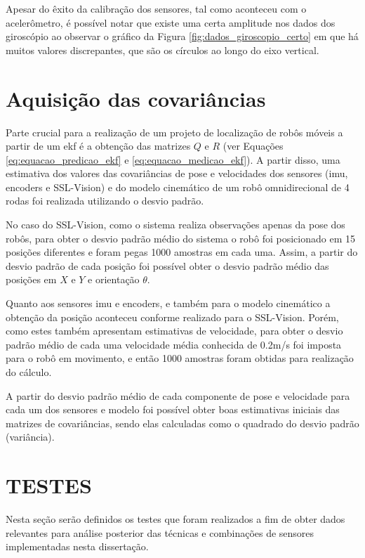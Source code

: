 \documentclass[acronym, symbols, table, deposito]{fei}
\begin{document}
	Apesar do êxito da calibração dos sensores, tal como aconteceu com o acelerômetro, é possível notar que existe uma certa amplitude nos dados dos giroscópio ao observar o gráfico da Figura \ref{fig:dados_giroscopio_certo} em que há muitos valores discrepantes, que são os círculos ao longo do eixo vertical.
	
	\section{Aquisição das covariâncias}
	
		Parte crucial para a realização de um projeto de localização de robôs móveis a partir de um \acrlong{ekf} é a obtenção das matrizes $Q$ e $R$ (ver Equações \eqref{eq:equacao_predicao_ekf} e \eqref{eq:equacao_medicao_ekf}). A partir disso, uma estimativa dos valores das covariâncias de pose e velocidades dos sensores (\acrshort{imu}, encoders e SSL-Vision) e do modelo cinemático de um robô omnidirecional de 4 rodas foi realizada utilizando o desvio padrão.
		
		No caso do SSL-Vision, como o sistema realiza observações apenas da pose dos robôs, para obter o desvio padrão médio do sistema o robô foi posicionado em 15 posições diferentes e foram pegas 1000 amostras em cada uma. Assim, a partir do desvio padrão de cada posição foi possível obter o desvio padrão médio das posições em $X$ e $Y$ e orientação $\theta$.
		
		Quanto aos sensores \acrshort{imu} e encoders, e também para o modelo cinemático a obtenção da posição aconteceu conforme realizado para o SSL-Vision. Porém, como estes também apresentam estimativas de velocidade, para obter o desvio padrão médio de cada uma velocidade média conhecida de 0.2m/s foi imposta para o robô em movimento, e então 1000 amostras foram obtidas para realização do cálculo.
		
		A partir do desvio padrão médio de cada componente de pose e velocidade para cada um dos sensores e modelo foi possível obter boas estimativas iniciais das matrizes de covariâncias, sendo elas calculadas como o quadrado do desvio padrão (variância).
	
	\section{TESTES}\label{sec:metodologia_testes}
	
		Nesta seção serão definidos os testes que foram realizados a fim de obter dados relevantes para análise posterior das técnicas e combinações de sensores implementadas nesta dissertação.
		
\end{document}
